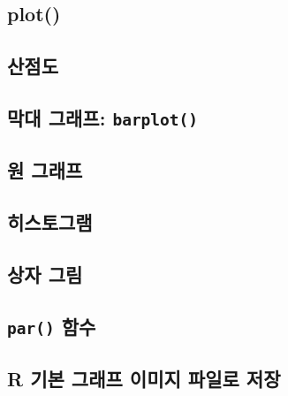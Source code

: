\documentclass[
  11pt,
]{krantz}
\begin{document}
\hypertarget{plot}{%
\subsection{plot()}\label{plot}}

\hypertarget{uxc0b0uxc810uxb3c4}{%
\subsection{산점도}\label{uxc0b0uxc810uxb3c4}}

\hypertarget{uxb9c9uxb300-uxadf8uxb798uxd504-barplot}{%
\subsection{\texorpdfstring{막대 그래프: \texttt{barplot()}}{막대 그래프: barplot()}}\label{uxb9c9uxb300-uxadf8uxb798uxd504-barplot}}

\hypertarget{uxc6d0-uxadf8uxb798uxd504}{%
\subsection{원 그래프}\label{uxc6d0-uxadf8uxb798uxd504}}

\hypertarget{uxd788uxc2a4uxd1a0uxadf8uxb7a8}{%
\subsection{히스토그램}\label{uxd788uxc2a4uxd1a0uxadf8uxb7a8}}

\hypertarget{uxc0c1uxc790-uxadf8uxb9bc}{%
\subsection{상자 그림}\label{uxc0c1uxc790-uxadf8uxb9bc}}

\hypertarget{par-uxd568uxc218}{%
\subsection{\texorpdfstring{\texttt{par()} 함수}{par() 함수}}\label{par-uxd568uxc218}}

\hypertarget{r-uxae30uxbcf8-uxadf8uxb798uxd504-uxc774uxbbf8uxc9c0-uxd30cuxc77cuxb85c-uxc800uxc7a5}{%
\subsection{R 기본 그래프 이미지 파일로 저장}\label{r-uxae30uxbcf8-uxadf8uxb798uxd504-uxc774uxbbf8uxc9c0-uxd30cuxc77cuxb85c-uxc800uxc7a5}}
\end{document}
